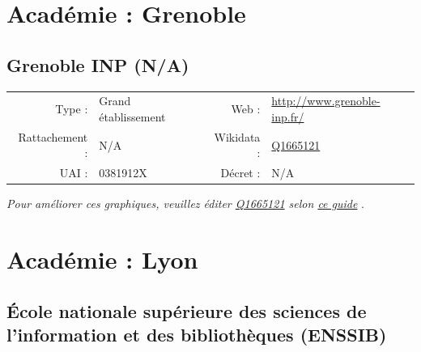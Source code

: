 \documentclass[12pt,french,landscape]{article}
\begin{document}

\newpage

\hypertarget{acaduxe9mie-grenoble-1}{%
\section{Académie : Grenoble}\label{acaduxe9mie-grenoble-1}}

\hypertarget{grenoble-inp-na}{%
\subsection{Grenoble INP (N/A)}\label{grenoble-inp-na}}

\begin{tabular*}{0.45\textwidth}{rp{2cm}rl}  
\hline  
Type : & Grand établissement & Web : &\href{http://www.grenoble-inp.fr/}{http://www.grenoble-inp.fr/} \\  
Rattachement : & N/A & Wikidata : & \href{https://www.wikidata.org/entity/Q1665121}{Q1665121} \\  
UAI : & 0381912X & Décret : & N/A \\  
\hline  
\end{tabular*}

\textit{\scriptsize Pour améliorer ces graphiques, veuillez éditer \href{https://www.wikidata.org/entity/Q1665121}{Q1665121}  selon \href{https://github.com/cpesr/wikidataESR/blob/master/Rmd/wikidataESR.md}{ce guide}}
.


\newpage

\hypertarget{acaduxe9mie-lyon-1}{%
\section{Académie : Lyon}\label{acaduxe9mie-lyon-1}}

\hypertarget{uxe9cole-nationale-supuxe9rieure-des-sciences-de-linformation-et-des-bibliothuxe8ques-enssib}{%
\subsection{École nationale supérieure des sciences de l'information et
des bibliothèques
(ENSSIB)}\label{uxe9cole-nationale-supuxe9rieure-des-sciences-de-linformation-et-des-bibliothuxe8ques-enssib}}
\end{document}
